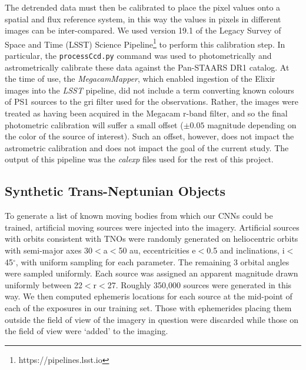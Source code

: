 \documentclass{aastex631}
\begin{document}
The detrended data must then be calibrated to place the pixel values onto a spatial and flux reference system, in this way the values in pixels in different images can be inter-compared.  
We used version 19.1 of the Legacy Survey of Space and Time (LSST) Science Pipeline\footnote{https://pipelines.lsst.io} to perform this calibration step.
In particular, the \texttt{processCcd.py} command was used to photometrically and astrometrically calibrate these data against the Pan-STAARS DR1 catalog.
At the time of use, the \emph{MegacamMapper}, which enabled ingestion of the Elixir images into the \emph{LSST} pipeline, did not include a term converting known colours of PS1 sources to the gri filter used for the observations.
Rather, the images were treated as having been acquired in the Megacam r-band filter, and so the final photometric calibration will suffer a small offset ($\pm 0.05$ magnitude depending on the color of the source of interest).
Such an offset, however, does not impact the astrometric calibration and does not impact the goal of the current study.
The output of this pipeline was the \emph{calexp} files used for the rest of this project.

\subsection{Synthetic Trans-Neptunian Objects}
\label{subsect:TNOs}

To generate a list of known moving bodies from which our CNNs could be trained, artificial moving sources were injected into the imagery. 
Artificial sources with orbits consistent with TNOs were randomly generated on heliocentric orbits with semi-major axes 30$<$a$<$50 au, eccentricities e$<$0.5 and inclinations, i$<$45$^\circ$, with uniform sampling for each parameter. 
The remaining 3 orbital angles were sampled uniformly.
Each source was assigned an apparent magnitude drawn uniformly between 22$<$r$<$27.  
Roughly 350,000 sources were generated in this way.
We then computed ephemeris locations for each source at the mid-point of each of the exposures in our training set. 
Those with ephemerides placing them outside the field of view of the imagery in question were discarded while those on the field of view were `added' to the imaging.
\end{document}
